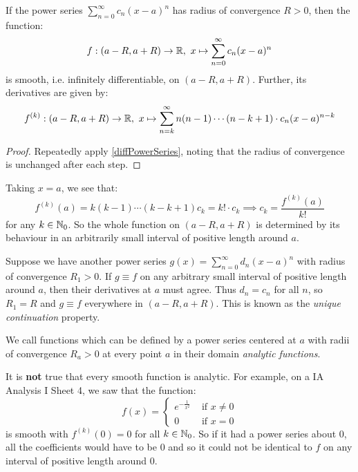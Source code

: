 \documentclass[../main.tex]{subfiles}
\begin{document}
\begin{corollary}
  If the power series $\sum_{n = 0}^{\infty} c_n(x - a)^n$ has radius of convergence $R > 0$, then the function:
  \[
    f: (a - R, a + R) \to \mathbb{R},\ x \mapsto \sum_{n = 0}^{\infty} c_n(x - a)^n
  \]
  is smooth, i.e. infinitely differentiable, on $(a - R, a + R)$.
  Further, its derivatives are given by:
  \[
    f^{(k)}: (a - R, a + R) \to \mathbb{R},\ x \mapsto \sum_{n = k}^{\infty} n(n - 1) \cdots (n - k + 1) \cdot c_n (x - a)^{n - k}
  \]
\end{corollary}
\begin{proof}
  Repeatedly apply \cref{diffPowerSeries}, noting that the radius of convergence is unchanged after each step.
\end{proof}
Taking $x = a$, we see that:
\[
  f^{(k)}(a) = k(k - 1) \cdots (k - k + 1) c_k = k! \cdot c_k \implies c_k = \frac{f^{(k)}(a)}{k!}
\]
for any $k \in \mathbb{N}_0$.
So the whole function on $(a - R, a + R)$ is determined by its behaviour in an arbitrarily small interval of positive length around $a$.

Suppose we have another power series $g(x) = \sum_{n = 0}^{\infty} d_n (x - a)^n$ with radius of convergence $R_1 > 0$.
If $g \equiv f$ on any arbitrary small interval of positive length around $a$, then their derivatives at $a$ must agree.
Thus $d_n = c_n$ for all $n$, so $R_1 = R$ and $g \equiv f$ everywhere in $(a - R, a + R)$.
This is known as the \textit{unique continuation} property.
\begin{definition}
  We call functions which can be defined by a power series centered at $a$ with radii of convergence $R_a > 0$ at every point $a$ in their domain \textit{analytic functions}.
\end{definition}
\begin{remark}[Warning]
  It is \textbf{not} true that every smooth function is analytic.
  For example, on a IA Analysis I Sheet 4, we saw that the function:
  \[
    f(x) = \begin{cases}
    e^{-\frac{1}{x^2}} & \text{ if } x \neq 0\\
    0 & \text{ if } x =0
    \end{cases}
  \]
  is smooth with $f^{(k)}(0) = 0$ for all $k \in \mathbb{N}_0$.
  So if it had a power series about 0, all the coefficients would have to be 0 and so it could not be identical to $f$ on any interval of positive length around $0$.
\end{remark}
\end{document}
